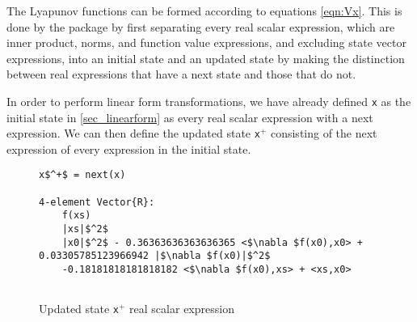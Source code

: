 The Lyapunov functions can be formed according to equations \eqref{eqn:Vx}. This is done by the package by first separating every real scalar expression, which are inner product, norms, and function value expressions, and excluding state vector expressions, into an initial state and an updated state by making the distinction between real expressions that have a next state and those that do not.

In order to perform linear form transformations, we have already defined \texttt{x} as the initial state in \cref{sec_linearform} as every real scalar expression with a next expression. We can then define the updated state \texttt{x$^+$} consisting of the next expression of every expression in the initial state. 

\begin{figure}[h!]
    \begin{lstlisting}[mathescape]
x$^+$ = next(x)

4-element Vector{R}:
    f(xs)       
    |xs|$^2$    
    |x0|$^2$ - 0.36363636363636365 <$\nabla $f(x0),x0> + 0.03305785123966942 |$\nabla $f(x0)|$^2$
    -0.18181818181818182 <$\nabla $f(x0),xs> + <xs,x0>
    
\end{lstlisting}
\caption{Updated state \texttt{x$^+$} real scalar expression}
\label{ex_nextstate}
\end{figure}


